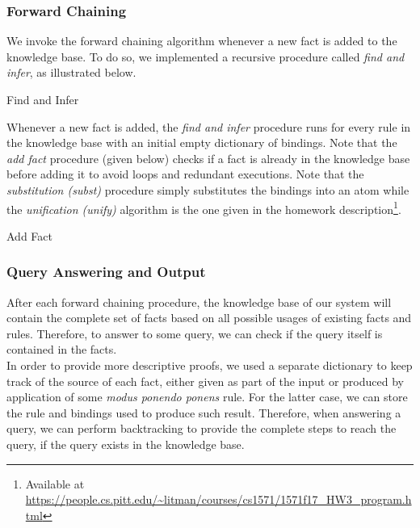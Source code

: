\documentclass[letterpaper]{article}
\begin{document}
\subsubsection{Forward Chaining}
We invoke the forward chaining algorithm whenever a new fact is added to the knowledge base. To do so, we implemented a recursive procedure called \textit{find and infer}, as illustrated below.\\
\begin{algorithm}[H]
	\LinesNumbered
	\caption{Find and Infer}
\end{algorithm}\noindent
Whenever a new fact is added, the \textit{find and infer} procedure runs for every rule in the knowledge base with an initial empty dictionary of bindings. Note that the \textit{add fact} procedure (given below) checks if a fact is already in the knowledge base before adding it to avoid loops and redundant executions. Note that the \textit{substitution (subst)} procedure simply substitutes the bindings into an atom while the \textit{unification (unify)} algorithm is the one given in the homework description\footnote{Available at \url{https://people.cs.pitt.edu/~litman/courses/cs1571/1571f17_HW3_program.html}}.\\
\begin{algorithm}[H]
	\LinesNumbered
	\caption{Add Fact}
\end{algorithm}
\subsubsection{Query Answering and Output}
After each forward chaining procedure, the knowledge base of our system will contain the complete set of facts based on all possible usages of existing facts and rules. Therefore, to answer to some query, we can check if the query itself is contained in the facts.\\
In order to provide more descriptive proofs, we used a separate dictionary to keep track of the source of each fact, either given as part of the input or produced by application of some \textit{modus ponendo ponens} rule. For the latter case, we can store the rule and bindings used to produce such result. Therefore, when answering a query, we can perform backtracking to provide the complete steps to reach the query, if the query exists in the knowledge base.
\end{document}
